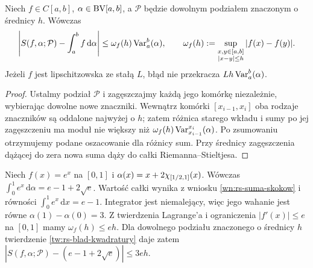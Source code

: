 \begin{twierdzenie}\label{tw:rs-blad-kwadratury}
Niech $f\in C[a,b]$, $\alpha\in\mathrm{BV}[a,b]$, a $\mathcal P$ będzie dowolnym podziałem znaczonym o średnicy $h$. Wówczas
\[
\left|S(f,\alpha;\mathcal P)-\int_a^b f\,\mathrm d\alpha\right|
\le \omega_f(h)\operatorname{Var}_a^b(\alpha),
\qquad
\omega_f(h):=\sup_{\substack{x,y\in[a,b]\\|x-y|\le h}}|f(x)-f(y)|.
\]
Jeżeli $f$ jest lipschitzowska ze stałą $L$, błąd nie przekracza $Lh\operatorname{Var}_a^b(\alpha)$.
\end{twierdzenie}
\begin{proof}
Ustalmy podział $\mathcal P$ i zagęszczajmy każdą jego komórkę niezależnie, wybierając dowolne nowe znaczniki. Wewnątrz komórki $[x_{i-1},x_i]$ oba rodzaje znaczników są oddalone najwyżej o $h$; zatem różnica starego wkładu i sumy po jej zagęszczeniu ma moduł nie większy niż $\omega_f(h)\operatorname{Var}_{x_{i-1}}^{x_i}(\alpha)$. Po zsumowaniu otrzymujemy podane oszacowanie dla różnicy sum. Przy średnicy zagęszczenia dążącej do zera nowa suma dąży do całki Riemanna--Stieltjesa.
\end{proof}
\begin{przyklad}
Niech $f(x)=e^x$ na $[0,1]$ i $\alpha(x)=x+2\chi_{[1/2,1]}(x)$. Wówczas
$\int_0^1e^x\,\mathrm d\alpha=e-1+2\sqrt e$.
Wartość całki wynika z wniosku \ref{wn:rs-suma-skokow}
i równości $\int_0^1e^x\,\mathrm dx=e-1$.
Integrator jest niemalejący, więc jego wahanie
jest równe $\alpha(1)-\alpha(0)=3$.
Z twierdzenia Lagrange'a i ograniczenia
$|f'(x)|\le e$ na $[0,1]$ mamy
$\omega_f(h)\le eh$.
Dla dowolnego podziału znaczonego o średnicy $h$
twierdzenie \ref{tw:rs-blad-kwadratury} daje zatem
$|S(f,\alpha;\mathcal P)-(e-1+2\sqrt e)|\le 3eh$.
\end{przyklad}



